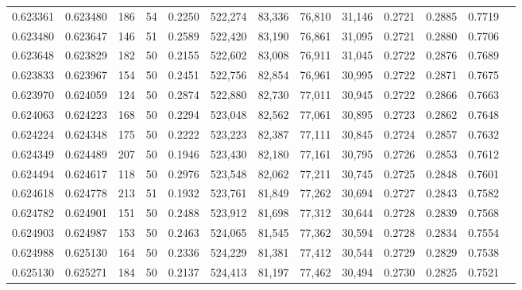 \begin{tabular}{rrrrrrrrrrrrr}
0.623361 & 0.623480 &   186 &  54 &                                     0.2250 & 522,274 &  83,336 &  76,810 &  31,146 & 0.2721 & 0.2885 & 0.7719 \\
0.623480 & 0.623647 &   146 &  51 &                                     0.2589 & 522,420 &  83,190 &  76,861 &  31,095 & 0.2721 & 0.2880 & 0.7706 \\
0.623648 & 0.623829 &   182 &  50 &                                     0.2155 & 522,602 &  83,008 &  76,911 &  31,045 & 0.2722 & 0.2876 & 0.7689 \\
0.623833 & 0.623967 &   154 &  50 &                                     0.2451 & 522,756 &  82,854 &  76,961 &  30,995 & 0.2722 & 0.2871 & 0.7675 \\
0.623970 & 0.624059 &   124 &  50 &                                     0.2874 & 522,880 &  82,730 &  77,011 &  30,945 & 0.2722 & 0.2866 & 0.7663 \\
0.624063 & 0.624223 &   168 &  50 &                                     0.2294 & 523,048 &  82,562 &  77,061 &  30,895 & 0.2723 & 0.2862 & 0.7648 \\
0.624224 & 0.624348 &   175 &  50 &                                     0.2222 & 523,223 &  82,387 &  77,111 &  30,845 & 0.2724 & 0.2857 & 0.7632 \\
0.624349 & 0.624489 &   207 &  50 &                                     0.1946 & 523,430 &  82,180 &  77,161 &  30,795 & 0.2726 & 0.2853 & 0.7612 \\
0.624494 & 0.624617 &   118 &  50 &                                     0.2976 & 523,548 &  82,062 &  77,211 &  30,745 & 0.2725 & 0.2848 & 0.7601 \\
0.624618 & 0.624778 &   213 &  51 &                                     0.1932 & 523,761 &  81,849 &  77,262 &  30,694 & 0.2727 & 0.2843 & 0.7582 \\
0.624782 & 0.624901 &   151 &  50 &                                     0.2488 & 523,912 &  81,698 &  77,312 &  30,644 & 0.2728 & 0.2839 & 0.7568 \\
0.624903 & 0.624987 &   153 &  50 &                                     0.2463 & 524,065 &  81,545 &  77,362 &  30,594 & 0.2728 & 0.2834 & 0.7554 \\
0.624988 & 0.625130 &   164 &  50 &                                     0.2336 & 524,229 &  81,381 &  77,412 &  30,544 & 0.2729 & 0.2829 & 0.7538 \\
0.625130 & 0.625271 &   184 &  50 &                                     0.2137 & 524,413 &  81,197 &  77,462 &  30,494 & 0.2730 & 0.2825 & 0.7521 \\

\end{tabular}
